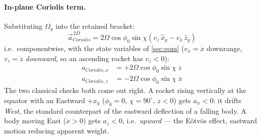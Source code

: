 {\paragraph{In-plane Coriolis term.} Substituting $\Omega_y$ into the retained bracket:
\begin{equation} \label{eq:coriolis_2d}
    \vec{a}_{Coriolis}^{\,2D} = 2\Omega\cos\phi_0\sin\chi\left(v_z\,\hat{x}_g - v_x\,\hat{z}_g\right)
\end{equation}
i.e.\ componentwise, with the state variables of \autoref{sec:eom} ($v_x = \dot{x}$
downrange, $v_z = \dot{z}$ \emph{downward}, so an ascending rocket has $v_z < 0$):
\begin{align}
    a_{Coriolis,x} &= +2\Omega\cos\phi_0\sin\chi\;\dot{z} \\
    a_{Coriolis,z} &= -2\Omega\cos\phi_0\sin\chi\;\dot{x}
\end{align}
The two classical checks both come out right. A rocket rising vertically at the equator with an
Eastward $+\hat{x}_g$ ($\phi_0=0$, $\chi=90^\circ$, $\dot{z}<0$) gets $a_x < 0$: it drifts
\emph{West}, the standard counterpart of the eastward deflection of a falling body. A body moving
East ($\dot{x}>0$) gets $a_z < 0$, i.e.\ \emph{upward} --- the E\"otv\"os effect, eastward motion
reducing apparent weight.

}
